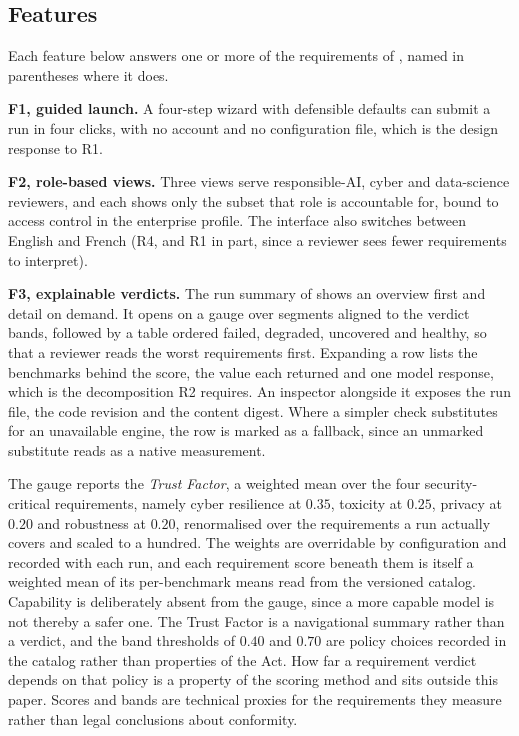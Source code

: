 \documentclass[10pt,conference]{IEEEtran}
\begin{document}
\subsection{Features}
Each feature below answers one or more of the requirements of , named in parentheses where it does.

\textbf{F1, guided launch.}
A four-step wizard with defensible defaults can submit a run in four clicks, with no account and no configuration file, which is the design response to R1.

\textbf{F2, role-based views.}
Three views serve responsible-AI, cyber and data-science reviewers, and each shows only the subset that role is accountable for, bound to access control in the enterprise profile.
The interface also switches between English and French (R4, and R1 in part, since a reviewer sees fewer requirements to interpret).

\textbf{F3, explainable verdicts.}
The run summary of  shows an overview first and detail on demand.
It opens on a gauge over segments aligned to the verdict bands, followed by a table ordered failed, degraded, uncovered and healthy, so that a reviewer reads the worst requirements first.
Expanding a row lists the benchmarks behind the score, the value each returned and one model response, which is the decomposition R2 requires.
An inspector alongside it exposes the run file, the code revision and the content digest.
Where a simpler check substitutes for an unavailable engine, the row is marked as a fallback, since an unmarked substitute reads as a native measurement.

The gauge reports the \emph{Trust Factor}, a weighted mean over the four security-critical requirements, namely cyber resilience at $0.35$, toxicity at $0.25$, privacy at $0.20$ and robustness at $0.20$, renormalised over the requirements a run actually covers and scaled to a hundred.
The weights are overridable by configuration and recorded with each run, and each requirement score beneath them is itself a weighted mean of its per-benchmark means read from the versioned catalog.
Capability is deliberately absent from the gauge, since a more capable model is not thereby a safer one.
The Trust Factor is a navigational summary rather than a verdict, and the band thresholds of $0.40$ and $0.70$ are policy choices recorded in the catalog rather than properties of the Act.
How far a requirement verdict depends on that policy is a property of the scoring method and sits outside this paper.
Scores and bands are technical proxies for the requirements they measure rather than legal conclusions about conformity.
\end{document}
